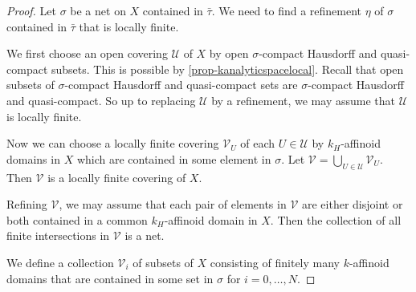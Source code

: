 \begin{proof}
    Let $\sigma$ be a net on $X$ contained in $\bar{\tau}$. We need to find a refinement $\eta$ of $\sigma$ contained in $\bar{\tau}$ that is locally finite.

    We first choose an open covering $\mathcal{U}$ of $X$ by open $\sigma$-compact Hausdorff and quasi-compact subsets. This is possible by \cref{prop-kanalyticspacelocal}.
    Recall that open subsets of $\sigma$-compact Hausdorff and quasi-compact sets are $\sigma$-compact Hausdorff and quasi-compact. So up to replacing $\mathcal{U}$ by a refinement, we may assume that $\mathcal{U}$ is locally finite. 
    
    Now we can choose a locally finite covering $\mathcal{V}_U$ of each $U\in \mathcal{U}$ by $k_H$-affinoid domains in $X$ which are contained in some element in $\sigma$. Let $\mathcal{V}=\bigcup_{U\in \mathcal{U}}\mathcal{V}_U$. Then $\mathcal{V}$ is a locally finite covering of $X$. 
    
    Refining $\mathcal{V}$, we may assume that each pair of elements in $\mathcal{V}$ are either disjoint or both contained in a common $k_H$-affinoid domain in $X$. Then the collection of all finite intersections in $\mathcal{V}$ is a net.
    
    
    \iffalse
    
    We define a collection $\mathcal{V}_i$ of subsets of $X$ consisting of finitely many $k$-affinoid domains that are contained in some set in $\sigma$ for $i=0,\ldots,N$. 
    

\end{proof}
